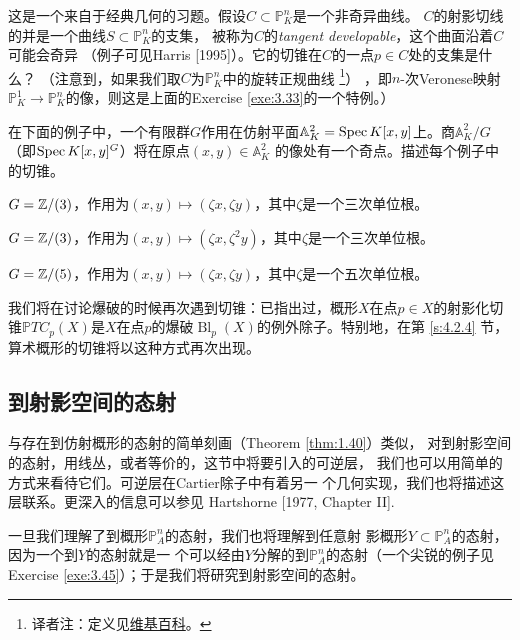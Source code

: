 \begin{exe}\label{exe:3.34}
这是一个来自于经典几何的习题。假设$C\subset \mathbb P_K^n$是一个非奇异曲线。
$C$的射影切线的并是一个曲线$S\subset \mathbb P_K^n$的支集，
被称为$C$的\textit{tangent developable}，这个曲面沿着$C$可能会奇异
（例子可见Harris [1995]）。它的切锥在$C$的一点$p\in C$处的支集是什么？
（注意到，如果我们取$C$为$\mathbb P_K^n$中的旋转正规曲线%
\footnote{译者注：定义见\href{https://en.wikipedia.org/wiki/Rational_normal_curve}{维基百科}。}）%
，即$n$-次Veronese映射$\mathbb P_K^1\to\mathbb P_K^n$的像，则这是上面的Exercise \ref{exe:3.33}的一个特例。）
\end{exe}

\begin{exe}\label{exe:3.35}
在下面的例子中，一个有限群$G$作用在仿射平面$\mathbb A^2_K=\operatorname{Spec} K[x,y]$上。商$\mathbb A_K^2/G$（即$\operatorname{Spec} K[x,y]^G$）将在原点$(x,y)\in \mathbb A_K^2$ %
的像处有一个奇点。描述每个例子中的切锥。
\begin{compactenum}[(a)]
\item $G=\mathbb{Z}/(3)$，作用为$(x,y)\mapsto (\zeta x,\zeta y)$，其中$\zeta$是一个三次单位根。
\item $G=\mathbb{Z}/(3)$，作用为$(x,y)\mapsto (\zeta x,\zeta^2 y)$，其中$\zeta$是一个三次单位根。
\item $G=\mathbb{Z}/(5)$，作用为$(x,y)\mapsto (\zeta x,\zeta y)$，其中$\zeta$是一个五次单位根。
\end{compactenum}
\end{exe}

我们将在讨论爆破的时候再次遇到切锥：已指出过，概形$X$在点$p\in X$的射影化切锥$\mathbb PTC_p(X)$是$X$在点$p$的爆破$\operatorname{Bl}_p(X)$的例外除子。特别地，在第 \ref{s:4.2.4} 节，算术概形的切锥将以这种方式再次出现。

\subsection{到射影空间的态射} \label{s:3.2.5}

与存在到仿射概形的态射的简单刻画（Theorem \ref{thm:1.40}）类似，
对到射影空间的态射，用线丛，或者等价的，这节中将要引入的可逆层，
我们也可以用简单的方式来看待它们。可逆层在Cartier除子中有着另一
个几何实现，我们也将描述这层联系。更深入的信息可以参见
Hartshorne [1977, Chapter II].

一旦我们理解了到概形$\mathbb P_A^n$的态射，我们也将理解到任意射  
影概形$Y\subset \mathbb P_A^n$的态射，因为一个到$Y$的态射就是一
个可以经由$Y$分解的到$\mathbb P_A^n$的态射（一个尖锐的例子见
Exercise \ref{exe:3.45}）；于是我们将研究到射影空间的态射。

